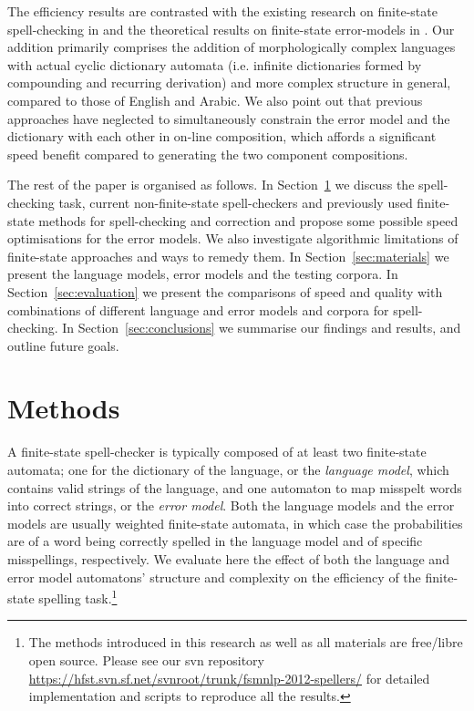 \documentclass[free]{flammie}
\begin{document}
The efficiency results are contrasted with the existing research on
finite-state spell-checking in \cite{hassan/2008} and the theoretical
results on finite-state error-models in \cite{mitankin/2005}.  Our addition
primarily comprises the addition of morphologically complex languages with
actual cyclic dictionary automata (i.e. infinite dictionaries formed by
compounding and recurring derivation) and more complex structure in general,
compared to those of English and Arabic. We also point out that previous
approaches have neglected to simultaneously constrain the error model and the
dictionary with each other in on-line composition, which affords a significant
speed benefit compared to generating the two component compositions.

The rest of the paper is organised as follows. In Section~\ref{sec:methods} we
discuss the spell-checking task, current non-finite-state spell-checkers and
previously used finite-state methods for spell-checking and correction and
propose some possible speed optimisations for the error models.
We also investigate algorithmic limitations of finite-state approaches and
ways to remedy them. In
Section~\ref{sec:materials} we present the language models, error models and the
testing corpora. In Section~\ref{sec:evaluation} we
present the comparisons of speed and quality with combinations of different
language and error models and corpora for spell-checking. In
Section~\ref{sec:conclusions} we summarise our findings and results,
and outline future goals.


\section{Methods}
\label{sec:methods}

A finite-state spell-checker is typically composed of at least two finite-state
automata; one for the dictionary of the language, or the \emph{language model},
which contains valid strings of the language, and one automaton to map misspelt
words into correct strings, or the \emph{error model}. Both the language models
and the error models are usually weighted finite-state automata, in which
case the probabilities are of a word being correctly spelled in the language
model and of specific misspellings, respectively.
We evaluate here the effect of both the language and error model automatons'
structure and complexity on the efficiency of the finite-state
spelling task.\footnote{The methods introduced in this research
as well as all materials are free/libre open source. Please see our svn
repository \url{https://hfst.svn.sf.net/svnroot/trunk/fsmnlp-2012-spellers/}
for detailed implementation and scripts to reproduce all the
results.}
\end{document}
